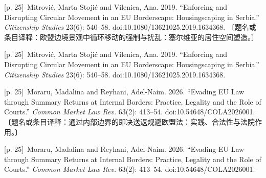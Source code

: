 \documentclass[10pt,a4paper]{article}
\begin{document}
\noindent\begin{minipage}{\textwidth}\begin{minipage}[t]{\dimexpr.5\textwidth-4mm\relax}{\scriptsize\color{gray} [p. 25]}\ Mitrović, Marta Stojić and Vilenica, Ana. 2019. “Enforcing and Disrupting Circular Movement in an EU Borderscape: Housingscaping in Serbia.” \textit{Citizenship Studies} 23(6): 540–58. doi:10.1080/13621025.2019.1634368. 〔题名或条目译释：欧盟边境景观中循环移动的强制与扰乱：塞尔维亚的居住空间塑造。〕\par\end{minipage}\hfill\begin{minipage}[t]{\dimexpr.5\textwidth-4mm\relax}{\scriptsize\color{gray} [p. 25]}\ Mitrović, Marta Stojić and Vilenica, Ana. 2019. “Enforcing and Disrupting Circular Movement in an EU Borderscape: Housingscaping in Serbia.” \textit{Citizenship Studies} 23(6): 540–58. doi:10.1080/13621025.2019.1634368.\par\end{minipage}\end{minipage}\par
\noindent\begin{minipage}{\textwidth}\begin{minipage}[t]{\dimexpr.5\textwidth-4mm\relax}{\scriptsize\color{gray} [p. 25]}\ Moraru, Madalina and Reyhani, Adel-Naim. 2026. “Evading EU Law through Summary Returns at Internal Borders: Practice, Legality and the Role of Courts.” \textit{Common Market Law Rev.} 63(2): 413–54. doi:10.54648/COLA2026001. 〔题名或条目译释：通过内部边界的即决送返规避欧盟法：实践、合法性与法院作用。〕\par\end{minipage}\hfill\begin{minipage}[t]{\dimexpr.5\textwidth-4mm\relax}{\scriptsize\color{gray} [p. 25]}\ Moraru, Madalina and Reyhani, Adel-Naim. 2026. “Evading EU Law through Summary Returns at Internal Borders: Practice, Legality and the Role of Courts.” \textit{Common Market Law Rev.} 63(2): 413–54. doi:10.54648/COLA2026001.\par\end{minipage}\end{minipage}\par
\end{document}
